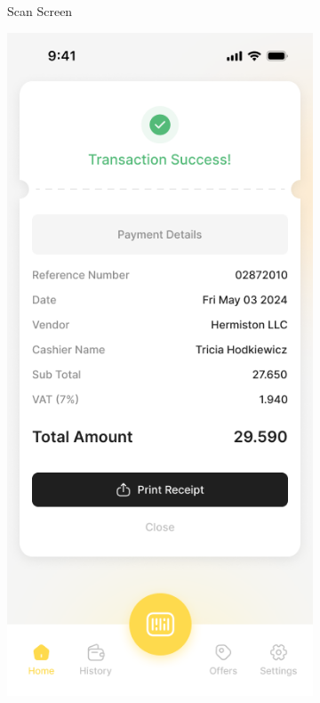 \begin{figure}[H]
\begin{subfigure}[b]{0.32\textwidth}
        \caption{Scan Screen}
        \label{fig:scan_screen}
    \end{subfigure}
    \hfill
    \begin{subfigure}[b]{0.32\textwidth}
        \centering
        \includegraphics[width=\textwidth]{images/transaction_screen.png}

\end{subfigure}
\end{figure}
